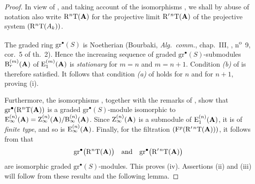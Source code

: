 \begin{proof}
In view of , and taking account of the
isomorphisms , we shall by abuse of notation also
write $\mathrm{R}^n\mathrm{T}(\mathbf{A})$ for the projective limit
$\mathrm{R}'^{\,n}\mathrm{T}(\mathbf{A})$ of the projective system
$(\mathrm{R}^n\mathrm{T}(A_k))$.

The graded ring $\mathrm{gr}^\bullet(S)$ is Noetherian
(Bourbaki, \emph{Alg.\ comm.}, chap.~III, ,
n\textsuperscript{o}~9, cor.~5 of th.~2).
Hence the increasing sequence of graded
$\mathrm{gr}^\bullet(S)$-submodules
$\mathrm{B}_r^{(m)}(\mathbf{A})$ of
$\mathrm{E}_1^{(m)}(\mathbf{A})$ is \emph{stationary} for $m=n$ and
$m=n+1$.
Condition \emph{(b)} of  is therefore satisfied.
It follows that condition \emph{(a)} of  holds for
$n$ and for $n+1$, proving {\rm(i)}.

Furthermore, the isomorphisms , together with the
remarks of , show that
$\mathrm{gr}^\bullet(\mathrm{R}^n\mathrm{T}(\mathbf{A}))$ is a graded
$\mathrm{gr}^\bullet(S)$-module isomorphic to $\mathrm{E}_\infty^{(n)}(\mathbf{A})
=
\mathrm{Z}_\infty^{(n)}(\mathbf{A})
/
\mathrm{B}_\infty^{(n)}(\mathbf{A})$.
Since $\mathrm{Z}_\infty^{(n)}(\mathbf{A})$ is a submodule of
$\mathrm{E}_1^{(n)}(\mathbf{A})$, it is of \emph{finite type}, and so is
$\mathrm{E}_\infty^{(n)}(\mathbf{A})$.
Finally, for the filtration
$(\mathrm{F}^p(\mathrm{R}'^{\,n}\mathrm{T}(\mathbf{A})))$, it follows from
 that
\[
  \mathrm{gr}^\bullet\bigl(\mathrm{R}^n\mathrm{T}(\mathbf{A})\bigr)
  \quad\hbox{and}\quad
  \mathrm{gr}^\bullet\bigl(\mathrm{R}'^{\,n}\mathrm{T}(\mathbf{A})\bigr)
\]
are isomorphic graded $\mathrm{gr}^\bullet(S)$-modules.
This proves {\rm(iv)}.
Assertions {\rm(ii)} and {\rm(iii)} will follow from these results
and the following lemma.
\end{proof}

